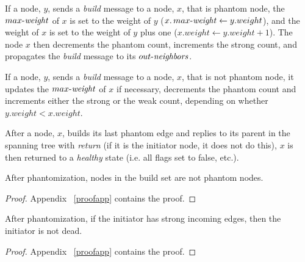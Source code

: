 If a node, $y$, sends a \emph{build} message to a node, $x$, that is phantom node, the
$\mathop{\mbox{$max$-$\mathit{weight}$}}$ of $x$ is set to the weight of $y$ ($x.\mathop{\mbox{$max$-$\mathit{weight}$}} \leftarrow y.weight$),
and the weight of $x$ is set to the weight of $y$ plus one ($x.weight \leftarrow
y.weight+1$).  The node $x$ then
decrements the phantom count, increments the strong count, and
propagates the \emph{build} message to its $\mathop{\mbox{$out$-$\mathit{neighbors}$}}$.

If a node, $y$, sends a \emph{build} message to a node, $x$, that is not phantom node, it
updates the $\mathop{\mbox{$max$-$\mathit{weight}$}}$ of $x$ if necessary, decrements
the phantom count and increments either the strong or the weak count, depending
on whether $y.weight < x.weight$. %

After a node, $x$, builds its last phantom edge and replies to its parent in the spanning tree with
\emph{return} (if it is the initiator node, it does not do this),
$x$ is then returned to a
\emph{healthy} state (i.e. all flags set to false,
etc.).




\begin{lemma}
After phantomization, nodes in the build set are not phantom nodes.
\label{lem:nophan}
\end{lemma}
\begin{proof}
Appendix ~\ref{proofapp} contains the proof.
\end{proof}

\begin{lemma}
After phantomization, if the initiator has strong incoming edges, then the
initiator is not dead.
\label{lem:buildset}
\end{lemma}
\begin{proof}
Appendix ~\ref{proofapp} contains the proof.
\end{proof}


